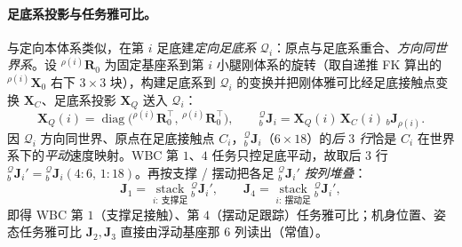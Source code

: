 \paragraph{足底系投影与任务雅可比。}
与定向本体系类似，在第 $i$ 足底建\emph{定向足底系} $\mathcal{Q}_i$：原点与足底系重合、\emph{方向同世界系}。设 ${}^{\rho(i)}\mathbf{R}_0$ 为固定基座系到第 $i$ 小腿刚体系的旋转（取自递推 FK 算出的 ${}^{\rho(i)}\mathbf{X}_0$ 右下 $3\times3$ 块），构建足底系到 $\mathcal{Q}_i$ 的变换并把刚体雅可比经足底接触点变换 $\mathbf{X}_C$、足底系投影 $\mathbf{X}_Q$ 送入 $\mathcal{Q}_i$\cite{yu2021quadruped}：
\begin{equation}
  \mathbf{X}_Q(i)=\operatorname{diag}\big({}^{\rho(i)}\mathbf{R}_0^\top,\,{}^{\rho(i)}\mathbf{R}_0^\top\big),
  \qquad
  {}_{b}^{\mathcal{Q}}\mathbf{J}_i=\mathbf{X}_Q(i)\,\mathbf{X}_C(i)\,{}_{b}\mathbf{J}_{\rho(i)}.
  \label{eq:qk-task-jacobian}
\end{equation}
因 $\mathcal{Q}_i$ 方向同世界、原点在足底接触点 $C_i$，${}_{b}^{\mathcal{Q}}\mathbf{J}_i$（$6\times18$）的\emph{后 $3$ 行}恰是 $C_i$ 在世界系下的\emph{平动}速度映射。WBC 第 $1$、$4$ 任务只控足底平动，故取后 $3$ 行 ${}_{b}^{\mathcal{Q}}\mathbf{J}_i'={}_{b}^{\mathcal{Q}}\mathbf{J}_i(4\!:\!6,\,1\!:\!18)$。再按支撑 / 摆动把各足 ${}_{b}^{\mathcal{Q}}\mathbf{J}_i'$ \emph{按列堆叠}\cite{yu2021quadruped}：
\begin{equation}
  \mathbf{J}_1=\operatorname*{stack}_{i:\ \text{支撑足}}{}_{b}^{\mathcal{Q}}\mathbf{J}_i',
  \qquad
  \mathbf{J}_4=\operatorname*{stack}_{i:\ \text{摆动足}}{}_{b}^{\mathcal{Q}}\mathbf{J}_i',
  \label{eq:qk-J1J4-assemble}
\end{equation}
即得 WBC 第 $1$（支撑足接触）、第 $4$（摆动足跟踪）任务雅可比；机身位置、姿态任务雅可比 $\mathbf{J}_2,\mathbf{J}_3$ 直接由浮动基座那 $6$ 列读出（常值）\cite{yu2021quadruped}。

